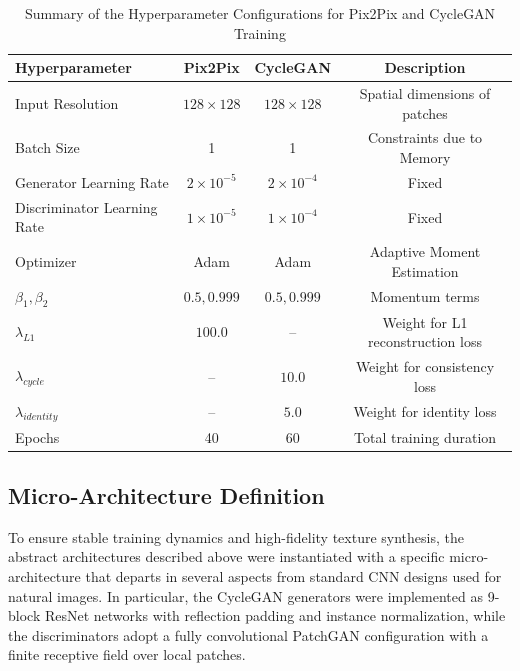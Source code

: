 \begin{table}[htbp]
\centering
\caption{Summary of the Hyperparameter Configurations for Pix2Pix and CycleGAN Training}
\label{tab:hyperparams}
\begin{tabular}{lccc}
\hline
\textbf{Hyperparameter} & \textbf{Pix2Pix} & \textbf{CycleGAN} & \textbf{Description} \\ \hline
Input Resolution & $128 \times 128$ & $128 \times 128$ & Spatial dimensions of patches \\
Batch Size & 1 & 1 & Constraints due to Memory \\
Generator Learning Rate & $2 \times 10^{-5}$ & $2 \times 10^{-4}$ & Fixed \\
Discriminator Learning Rate & $1 \times 10^{-5}$ & $1 \times 10^{-4}$ & Fixed \\
Optimizer & Adam & Adam & Adaptive Moment Estimation \\
$\beta_1, \beta_2$ & $0.5, 0.999$ & $0.5, 0.999$ & Momentum terms \\
$\lambda_{L1}$ & $100.0$ & -- & Weight for L1 reconstruction loss \\
$\lambda_{cycle}$ & -- & $10.0$ & Weight for consistency loss \\
$\lambda_{identity}$ & -- & $5.0$ & Weight for identity loss \\
Epochs & 40 & 60 &Total training duration \\ \hline
\end{tabular}
\end{table}

\subsection{Micro-Architecture Definition}
To ensure stable training dynamics and high-fidelity texture synthesis, the abstract architectures described above were instantiated with a specific micro-architecture that departs in several aspects from standard CNN designs used for natural images.
In particular, the CycleGAN generators were implemented as 9-block ResNet networks with reflection padding and instance normalization, while the discriminators adopt a fully convolutional PatchGAN configuration with a finite receptive field over local patches.

